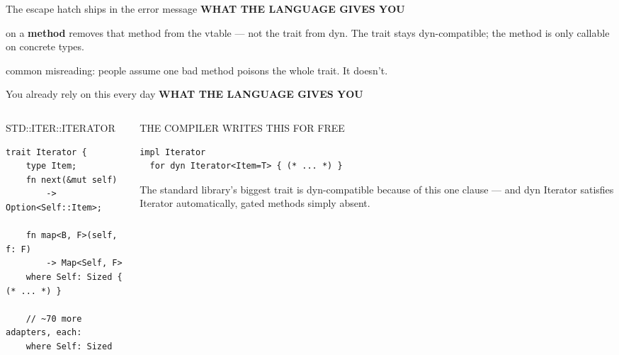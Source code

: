\documentclass[aspectratio=169,11pt,t]{beamer}
\newcommand{\code}[1]{{\ttfamily\small\color{oxidesoft}#1}}
\newcommand{\eyebrow}[2][steel]{{\ttfamily\scriptsize\bfseries\color{#1}\MakeUppercase{#2}}\par\vspace{0.4em}}
\newcommand{\panelhd}[1]{{\ttfamily\scriptsize\color{dim}\MakeUppercase{#1}}\\[3pt]}
\newcommand{\lede}[1]{{\color{muted}\fontsize{13}{18.5}\selectfont #1\par}}
\newcommand{\ledesm}[1]{{\color{muted}\fontsize{11.3}{16}\selectfont #1\par}}
\newcommand{\dnote}[1]{{\ttfamily\scriptsize\color{dim}#1\par}}
\newcommand{\tx}[1]{{\color{text}\bfseries#1}}
\begin{document}
\begin{frame}[fragile]{The escape hatch ships in the error message}
\eyebrow{What the language gives you}
\vspace{0.2em}
\vspace{0.9em}
\lede{\code{where Self: Sized} on a \tx{method} removes that method from the vtable --- not the trait from \code{dyn}. The trait stays dyn-compatible; the method is only callable on concrete types.}
\vspace{0.4em}
\dnote{common misreading: people assume one bad method poisons the whole trait. It doesn't.}
\end{frame}

\begin{frame}[fragile]{You already rely on this every day}
\eyebrow{What the language gives you}
\begin{columns}[T]
\begin{column}{0.52\textwidth}
\panelhd{std::iter::Iterator}
\begin{lstlisting}
trait Iterator {
    type Item;
    fn next(&mut self)
        -> Option<Self::Item>;

    fn map<B, F>(self, f: F)
        -> Map<Self, F>
    where Self: Sized { (* ... *) }

    // ~70 more adapters, each:
    where Self: Sized
\end{lstlisting}
\end{column}
\begin{column}{0.46\textwidth}
\panelhd{the compiler writes this for free}
\begin{lstlisting}
impl Iterator
  for dyn Iterator<Item=T> { (* ... *) }
\end{lstlisting}
\vspace{1em}
\ledesm{The standard library's biggest trait is dyn-compatible because of this one clause --- and \code{dyn Iterator} satisfies \code{Iterator} automatically, gated methods simply absent.}
\end{column}
\end{columns}
\end{frame}
\end{document}
